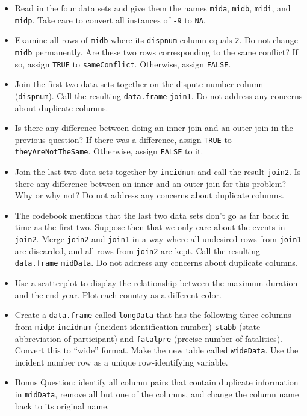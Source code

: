 \documentclass[12pt,krantz2]{krantz}
\providecommand{\tightlist}{%
  \setlength{\itemsep}{0pt}\setlength{\parskip}{0pt}}
\begin{document}
\begin{itemize}
\tightlist
\item
  Read in the four data sets and give them the names \texttt{mida}, \texttt{midb}, \texttt{midi}, and \texttt{midp}. Take care to convert all instances of \texttt{-9} to \texttt{NA}.
\item
  Examine all rows of \texttt{midb} where its \texttt{dispnum} column equals \texttt{2}. Do not change \texttt{midb} permanently. Are these two rows corresponding to the same conflict? If so, assign \texttt{TRUE} to \texttt{sameConflict}. Otherwise, assign \texttt{FALSE}.
\item
  Join the first two data sets together on the dispute number column (\texttt{dispnum}). Call the resulting \texttt{data.frame} \texttt{join1}. Do not address any concerns about duplicate columns.
\item
  Is there any difference between doing an inner join and an outer join in the previous question? If there was a difference, assign \texttt{TRUE} to \texttt{theyAreNotTheSame}. Otherwise, assign \texttt{FALSE} to it.
\item
  Join the last two data sets together by \texttt{incidnum} and call the result \texttt{join2}. Is there any difference between an inner and an outer join for this problem? Why or why not? Do not address any concerns about duplicate columns.
\item
  The codebook mentions that the last two data sets don't go as far back in time as the first two. Suppose then that we only care about the events in \texttt{join2}. Merge \texttt{join2} and \texttt{join1} in a way where all undesired rows from \texttt{join1} are discarded, and all rows from \texttt{join2} are kept. Call the resulting \texttt{data.frame} \texttt{midData}. Do not address any concerns about duplicate columns.
\item
  Use a scatterplot to display the relationship between the maximum duration and the end year. Plot each country as a different color.
\item
  Create a \texttt{data.frame} called \texttt{longData} that has the following three columns from \texttt{midp}: \texttt{incidnum} (incident identification number) \texttt{stabb} (state abbreviation of participant) and \texttt{fatalpre} (precise number of fatalities). Convert this to ``wide'' format. Make the new table called \texttt{wideData}. Use the incident number row as a unique row-identifying variable.
\item
  Bonus Question: identify all column pairs that contain duplicate information in \texttt{midData}, remove all but one of the columns, and change the column name back to its original name.
\end{itemize}
\end{document}
